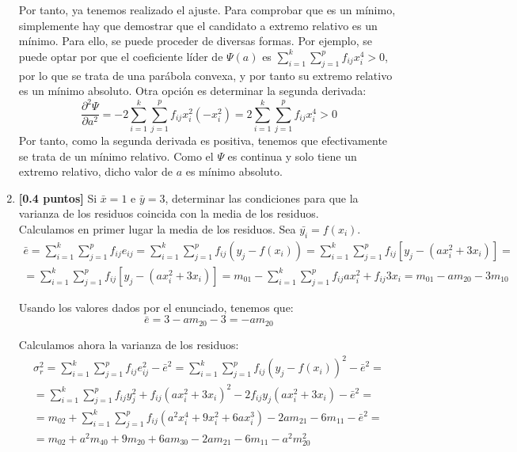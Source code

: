 \documentclass[12pt]{article}
\begin{document}
\begin{ejercicio}
\begin{enumerate}
    Por tanto, ya tenemos realizado el ajuste. Para comprobar que es un mínimo, simplemente hay que demostrar que el candidato a extremo relativo es un mínimo. Para ello, se puede proceder de diversas formas. Por ejemplo, se puede optar por que el coeficiente líder de $\Psi(a)$ es $\sum_{i=1}^k\sum_{j=1}^pf_{ij}x_i^4>0$, por lo que se trata de una parábola convexa, y por tanto su extremo relativo es un mínimo absoluto. Otra opción es determinar la segunda derivada:
    \begin{equation*}
        \frac{\partial^2 \Psi}{\partial a^2} = -2\sum_{i=1}^k \sum_{j=1}^p f_{ij}x_i^2(-x_i^2)
        = 2\sum_{i=1}^k \sum_{j=1}^p f_{ij}x_i^4 >0
    \end{equation*}
    Por tanto, como la segunda derivada es positiva, tenemos que efectivamente se trata de un mínimo relativo. Como el $\Psi$ es continua y solo tiene un extremo relativo, dicho valor de $a$ es mínimo absoluto.

    \item \textbf{[0.4 puntos]} Si $\bar{x}=1$ e $\bar{y}=3$, determinar las condiciones para que la varianza de los residuos coincida con la media de los residuos.\\

    Calculamos en primer lugar la media de los residuos. Sea $\bar{y_i}=f(x_i)$.
    \begin{multline*}
        \bar{e} = \sum_{i=1}^k \sum_{j=1}^p f_{ij}e_{ij}
        = \sum_{i=1}^k \sum_{j=1}^p f_{ij}(y_j-f(x_i))
        = \sum_{i=1}^k \sum_{j=1}^p f_{ij}[y_j-(ax_i^2+3x_i)] =\\
        = \sum_{i=1}^k \sum_{j=1}^p f_{ij}[y_j-(ax_i^2+3x_i)]
        = m_{01} -\sum_{i=1}^k \sum_{j=1}^p f_{ij}ax_i^2+ f_{ij}3x_i
        = m_{01} - am_{20} -3m_{10}
    \end{multline*}

    Usando los valores dados por el enunciado, tenemos que:
    \begin{equation*}
        \bar{e} = 3-am_{20}-3 = -am_{20} 
    \end{equation*}

    Calculamos ahora la varianza de los residuos:    
    \begin{multline*}
        \sigma^2_r = \sum_{i=1}^k \sum_{j=1}^p f_{ij}e_{ij}^2 -\bar{e}^2
        =\sum_{i=1}^k \sum_{j=1}^p f_{ij}(y_j-f(x_i))^2 -\bar{e}^2
        =\\= \sum_{i=1}^k \sum_{j=1}^p f_{ij}y_j^2 +f_{ij}(ax_i^2+3x_i)^2 -2f_{ij}y_j(ax_i^2+3x_i) -\bar{e}^2
        =\\= m_{02} + \sum_{i=1}^k \sum_{j=1}^p f_{ij}(a^2x_i^4+
        9x_i^2+6ax_i^3) -2am_{21}-6m_{11} -\bar{e}^2
        =\\= m_{02} +a^2m_{40} +9m_{20} +6am_{30} -2am_{21} -6m_{11} -a^2m_{20}^2
    \end{multline*}
    

\end{enumerate}
\end{ejercicio}
\end{document}
